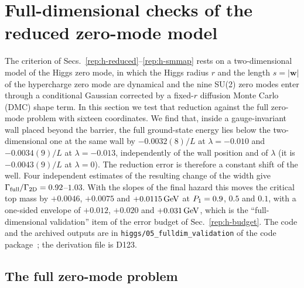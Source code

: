 
\section{Full-dimensional checks of the reduced zero-mode model}\label{rep:v-fulldim}

The criterion of Secs.~\ref{rep:h-reduced}--\ref{rep:h-smmap} rests on a two-dimensional model of the Higgs zero mode, in which the Higgs radius $r$ and the length $s=|\bm w|$ of the hypercharge zero mode are dynamical and the nine SU(2) zero modes enter through a conditional Gaussian corrected by a fixed-$r$ diffusion Monte Carlo (DMC) shape term.
In this section we test that reduction against the full zero-mode problem with sixteen coordinates.
We find that, inside a gauge-invariant wall placed beyond the barrier, the full ground-state energy lies below the two-dimensional one at the same wall by $-0.0032(8)/L$ at $\lambda=-0.010$ and $-0.0034(9)/L$ at $\lambda=-0.013$, independently of the wall position and of $\lambda$ (it is $-0.0043(9)/L$ at $\lambda=0$). %
The reduction error is therefore a constant shift of the well.
Four independent estimates of the resulting change of the width give $\Gamma_{\rm full}/\Gamma_{\rm 2D}=0.92$--$1.03$. %
With the slopes of the final hazard this moves the critical top mass by $+0.0046$, $+0.0075$ and $+0.0115\,\mathrm{GeV}$ at $P_1=0.9$, $0.5$ and $0.1$, with a one-sided envelope of $+0.012$, $+0.020$ and $+0.031\,\mathrm{GeV}$, which is the ``full-dimensional validation'' item of the error budget of Sec.~\ref{rep:h-budget}. %
The code and the archived outputs are in \texttt{higgs/05\_fulldim\_validation} of the code package~\cite{DNECv12code}; the derivation file is D123.

\subsection{The full zero-mode problem}\label{sec:v18-problem}

